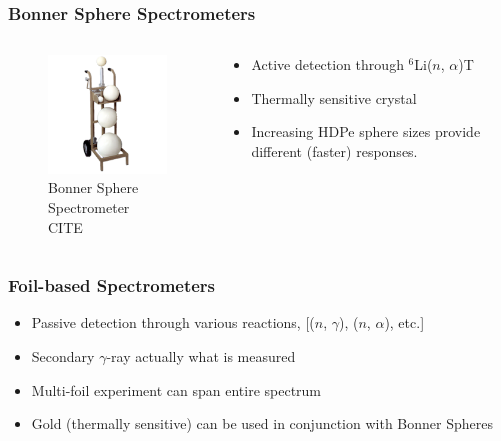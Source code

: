 \documentclass[fleqn]{beamer}
\begin{document}
\begin{frame}
\frametitle{Bonner Sphere Spectrometers}
\begin{columns}[c]
\begin{column}{.5\textwidth}
\begin{figure}
\includegraphics[width=\textwidth]{bss}
\caption{Bonner Sphere Spectrometer CITE}
\end{figure}
\end{column}
\begin{column}{.5\textwidth}
\begin{itemize}
\item Active detection through $^6$Li($n$, $\alpha$)T
\item Thermally sensitive crystal
\item Increasing HDPe sphere sizes provide different (faster) responses.
\end{itemize}
\end{column}
\end{columns}
\end{frame}

\begin{frame}
\frametitle{Foil-based Spectrometers}

\begin{itemize}
\item Passive detection through various reactions, [($n$, $\gamma$), ($n$, $\alpha$), etc.]
\item Secondary $\gamma$-ray actually what is measured
\item Multi-foil experiment can span entire spectrum
\item Gold (thermally sensitive) can be used in conjunction with Bonner Spheres
\end{itemize}

\end{frame}
\end{document}

